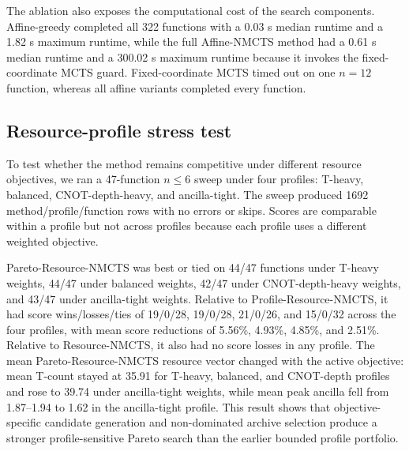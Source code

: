 \documentclass[11pt]{article}
\newcommand{\method}{Resource-NMCTS}
\newcommand{\affinemethod}{Affine-NMCTS}
\newcommand{\profilemethod}{Profile-Resource-NMCTS}
\newcommand{\paretomethod}{Pareto-Resource-NMCTS}
\newcommand{\ablationdataset}{ablation\_affine}
\begin{document}
The ablation also exposes the computational cost of the search components.
Affine-greedy completed all 322 functions with a 0.03 s median runtime and a
1.82 s maximum runtime, while the full \affinemethod{} method had a 0.61 s median
runtime and a 300.02 s maximum runtime because it invokes the fixed-coordinate
MCTS guard.  Fixed-coordinate MCTS timed out on one $n=12$ function, whereas all
affine variants completed every function.

\begin{table}[t]
\centering
\small
\caption{Runtime distribution on the \ablationdataset{} suite.  SSHR-H is
skipped for $n>6$ by the harness.}
\label{tab:runtime}

\end{table}

\begin{table}[t]
\centering
\small
\caption{Mean logical resources on completed rows in the \ablationdataset{}
suite.  SSHR-H means are over its supported $n\leq 6$ subset and therefore are
not directly comparable to all-suite means.}
\label{tab:resources}

\end{table}

\subsection{Resource-profile stress test}

To test whether the method remains competitive under different resource
objectives, we ran a 47-function $n\leq 6$ sweep under four profiles: T-heavy,
balanced, CNOT-depth-heavy, and ancilla-tight.  The sweep produced 1692
method/profile/function rows with no errors or skips.  Scores are comparable
within a profile but not across profiles because each profile uses a different
weighted objective.

\begin{table}[t]
\centering
\small
\caption{Objective-score best-or-tied counts in the resource-profile sweep.
Rows may sum to more than 47 because several methods can achieve the same
minimum score on a function.}
\label{tab:resource-sweep-winners}

\end{table}

\paretomethod{} was best or tied on 44/47 functions under T-heavy weights,
44/47 under balanced weights, 42/47 under CNOT-depth-heavy weights, and 43/47
under ancilla-tight weights.  Relative to \profilemethod{}, it had score
wins/losses/ties of 19/0/28, 19/0/28, 21/0/26, and 15/0/32 across the four
profiles, with mean score reductions of 5.56\%, 4.93\%, 4.85\%, and 2.51\%.
Relative to \method{}, it also had no score losses in any profile.  The mean
\paretomethod{} resource vector changed with the active objective: mean
T-count stayed at 35.91 for T-heavy, balanced, and CNOT-depth profiles and rose
to 39.74 under ancilla-tight weights, while mean peak ancilla fell from
1.87--1.94 to 1.62 in the ancilla-tight profile.  This result shows that
objective-specific candidate generation and non-dominated archive selection
produce a stronger profile-sensitive Pareto search than the earlier bounded
profile portfolio.
\end{document}

